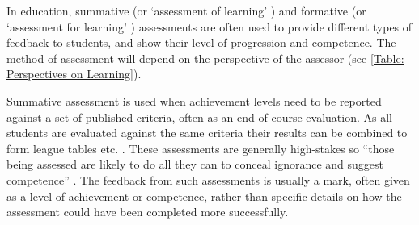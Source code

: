 In education, summative (or `assessment of learning' \citep{digiassess}) and formative (or `assessment for learning' \citep{digiassess}) assessments are often used to provide different types of feedback to students, and show their level of progression and competence. The method of assessment will depend on the perspective of the assessor (see \autoref{Table: Perspectives on Learning}).

Summative assessment is used when achievement levels need to be reported against a set of published criteria, often as an end of course evaluation. As all students are evaluated against the same criteria their results can be combined to form league tables etc. \citep{assessmentTypes}. These assessments are generally high-stakes so ``those being assessed are likely to do all they can to conceal ignorance and suggest competence'' \citep{knight2001briefing}. The feedback from such assessments is usually a mark, often given as a level of achievement or competence, rather than specific details on how the assessment could have been completed more successfully.

